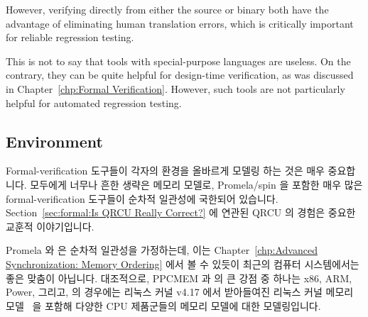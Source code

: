However, verifying directly from either the source or binary both have the
advantage of eliminating human translation errors, which is critically
important for reliable regression testing.

This is not to say that tools with special-purpose languages are useless.
On the contrary, they can be quite helpful for design-time verification,
as was discussed in
Chapter~\ref{chp:Formal Verification}.
However, such tools are not particularly helpful for automated regression
testing.
\fi

\subsection{Environment}
\label{sec:future:Environment}

Formal-verification 도구들이 각자의 환경을 올바르게 모델링 하는 것은 매우
중요합니다.
모두에게 너무나 흔한 생략은 메모리 모델로, Promela/spin 을 포함한 매우 많은
formal-verification 도구들이 순차적 일관성에 국한되어 있습니다.
Section~\ref{sec:formal:Is QRCU Really Correct?}
에 연관된 QRCU 의 경험은 중요한 교훈적 이야기입니다.

Promela 와  은 순차적 일관성을 가정하는데, 이는
Chapter~\ref{chp:Advanced Synchronization: Memory Ordering} 에서 볼 수 있듯이
최근의 컴퓨터 시스템에서는 좋은 맞춤이 아닙니다.
대조적으로, PPCMEM 과  의 큰 강점 중 하나는 x86, ARM, Power, 그리고,
 의 경우에는 리눅스 커널 v4.17 에서 받아들여진 리눅스 커널 메모리
모델~\cite{Alglave:2018:FSC:3173162.3177156} 을 포함해 다양한 CPU 제품군들의
메모리 모델에 대한 모델링입니다.
\iffalse

It is critically important that formal-verification tools correctly
model their environment.
One all-too-common omission is the memory model, where a great
many formal-verification tools, including Promela/spin, are
restricted to sequential consistency.
The QRCU experience related in
Section~\ref{sec:formal:Is QRCU Really Correct?}
is an important cautionary tale.

Promela and \co{spin} assume sequential consistency, which is not a
good match for modern computer systems, as was seen in
Chapter~\ref{chp:Advanced Synchronization: Memory Ordering}.
In contrast, one of the great strengths of PPCMEM and \co{herd}
is their detailed modeling of various CPU families memory models,
including x86, ARM, Power, and, in the case of \co{herd},
even a Linux-kernel memory model~\cite{Alglave:2018:FSC:3173162.3177156},
which has been accepted into version 4.17 of
the Linux kernel.
\fi

